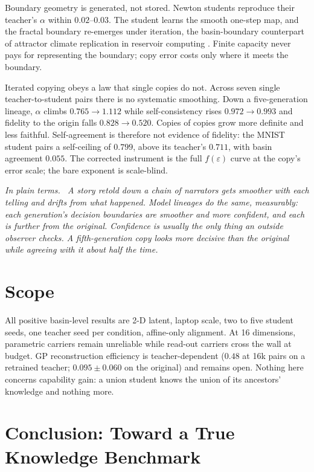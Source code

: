 \documentclass[11pt]{article}
\newenvironment{plainterms}{\par\medskip\noindent\itshape In plain terms.\ }{\par\medskip}
\begin{document}
Boundary geometry is generated, not stored. Newton students reproduce their teacher's $\alpha$ within $0.02$--$0.03$. The student learns the smooth one-step map, and the fractal boundary re-emerges under iteration, the basin-boundary counterpart of attractor climate replication in reservoir computing \citep{pathak2017,rohm2021,hart2024}. Finite capacity never pays for representing the boundary; copy error costs only where it meets the boundary.

Iterated copying obeys a law that single copies do not. Across seven single teacher-to-student pairs there is no systematic smoothing. Down a five-generation lineage, $\alpha$ climbs $0.765 \to 1.112$ while self-consistency rises $0.972 \to 0.993$ and fidelity to the origin falls $0.828 \to 0.520$. Copies of copies grow more definite and less faithful. Self-agreement is therefore not evidence of fidelity: the MNIST student pairs a self-ceiling of $0.799$, above its teacher's $0.711$, with basin agreement $0.055$. The corrected instrument is the full $f(\varepsilon)$ curve at the copy's error scale; the bare exponent is scale-blind.

\begin{plainterms}
A story retold down a chain of narrators gets smoother with each telling and drifts from what happened. Model lineages do the same, measurably: each generation's decision boundaries are smoother and more confident, and each is further from the original. Confidence is usually the only thing an outside observer checks. A fifth-generation copy looks more decisive than the original while agreeing with it about half the time.
\end{plainterms}

\section{Scope}

All positive basin-level results are 2-D latent, laptop scale, two to five student seeds, one teacher seed per condition, affine-only alignment. At 16 dimensions, parametric carriers remain unreliable while read-out carriers cross the wall at budget. GP reconstruction efficiency is teacher-dependent ($0.48$ at 16k pairs on a retrained teacher; $0.095 \pm 0.060$ on the original) and remains open. Nothing here concerns capability gain: a union student knows the union of its ancestors' knowledge and nothing more.

\section{Conclusion: Toward a True Knowledge Benchmark}
\end{document}
